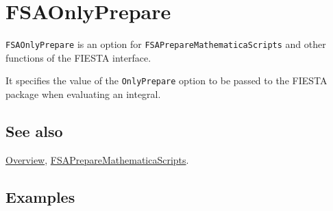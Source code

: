 \documentclass[../FeynHelpersManual.tex]{subfiles}
\begin{document}
\begin{Shaded}
\begin{Highlighting}[]
 
\end{Highlighting}
\end{Shaded}

\hypertarget{fsaonlyprepare}{
\section{FSAOnlyPrepare}\label{fsaonlyprepare}}

\texttt{FSAOnlyPrepare} is an option for
\texttt{FSAPrepareMathematicaScripts} and other functions of the FIESTA
interface.

It specifies the value of the \texttt{OnlyPrepare} option to be passed
to the FIESTA package when evaluating an integral.

\subsection{See also}

\hyperlink{toc}{Overview},
\hyperlink{fsapreparemathematicascripts}{FSAPrepareMathematicaScripts}.

\subsection{Examples}
\end{document}

